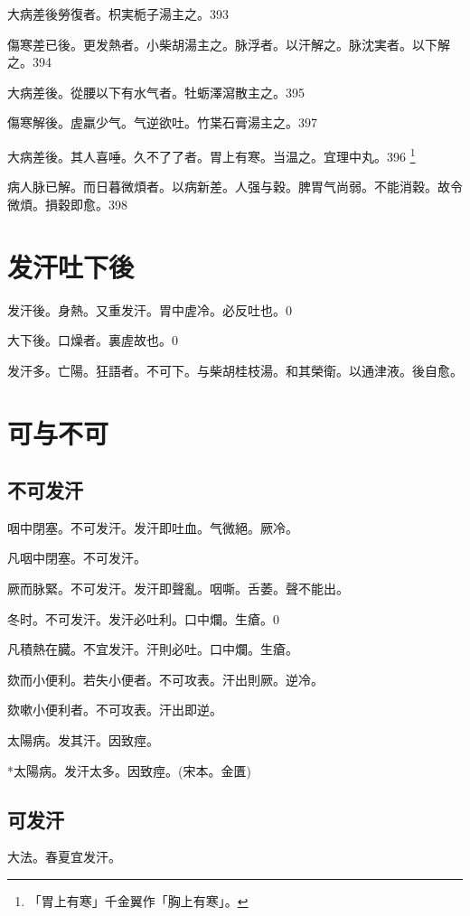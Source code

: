 大病差後勞復者。枳実栀子湯主之。393

傷寒差已後。更发熱者。小柴胡湯主之。脉浮者。以汗解之。脉沈実者。以下解之。394

大病差後。從腰以下有水气者。牡蛎澤瀉散主之。395

傷寒解後。虗羸少气。气逆欲吐。竹枼石膏湯主之。397

大病差後。其人喜唾。久不了了者。胃上有寒。当温之。宜理中丸。396
	\footnote{「胃上有寒」千金翼作「胸上有寒」。}

病人脉已解。而日暮微煩者。以病新差。人强与穀。脾胃气尚弱。不能消穀。故令微煩。損穀即愈。398

\chapter{发汗吐下後}

发汗後。身熱。又重发汗。胃中虗冷。必反吐也。0

大下後。口燥者。裏虗故也。0

发汗多。亡陽。狂語者。不可下。与柴胡桂枝湯。和其榮衛。以通津液。後自愈。

\chapter{可与不可}

\section{不可发汗}

咽中閉塞。不可发汗。发汗即吐血。气微絕。厥冷。

凡咽中閉塞。不可发汗。{\gaoben}

厥{\khaaitp 而脉緊}。不可发汗。发汗即聲亂。咽嘶。舌萎。聲不能出。

冬时。不可发汗。发汗必吐利。口中爛。生瘡。0

凡積熱在臓。不宜发汗。汗則必吐。口中爛。生瘡。{\gaoben}

欬而小便利。若失小便者。不可攻表。汗出則厥。逆冷。

欬嗽小便利者。不可攻表。汗出即逆。{\gaoben}

太陽病。发其汗。因致痙。

*太陽病。发汗太多。因致痙。(宋本。金匱)

\section{可发汗}

大法。春夏宜发汗。

